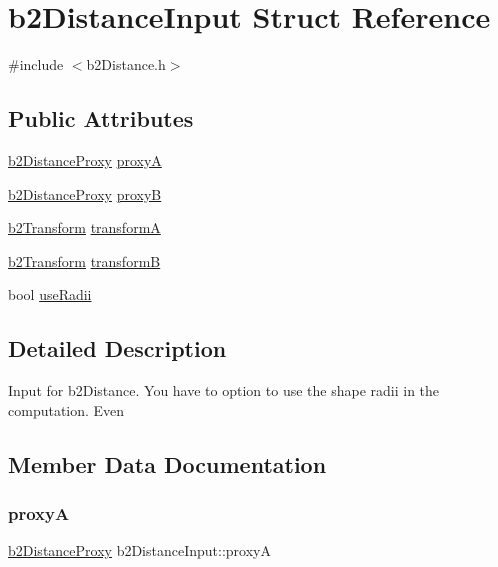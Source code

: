 \hypertarget{structb2_distance_input}{}\section{b2\+Distance\+Input Struct Reference}
\label{structb2_distance_input}


{\ttfamily \#include $<$b2\+Distance.\+h$>$}

\subsection*{Public Attributes}
\begin{DoxyCompactItemize}
\item 
\mbox{\hyperlink{structb2_distance_proxy}{b2\+Distance\+Proxy}} \mbox{\hyperlink{structb2_distance_input_a84d378f4f0e2f06fbe03d413e9dfbbd9}{proxyA}}
\item 
\mbox{\hyperlink{structb2_distance_proxy}{b2\+Distance\+Proxy}} \mbox{\hyperlink{structb2_distance_input_ad08521a9cdf9d418ececfd44de83a5d3}{proxyB}}
\item 
\mbox{\hyperlink{structb2_transform}{b2\+Transform}} \mbox{\hyperlink{structb2_distance_input_a0889c2f7120ba521d6e40e2a22834ddb}{transformA}}
\item 
\mbox{\hyperlink{structb2_transform}{b2\+Transform}} \mbox{\hyperlink{structb2_distance_input_a47352d7c5b3db80b2fb8cf338f1c1895}{transformB}}
\item 
bool \mbox{\hyperlink{structb2_distance_input_ab72a770be4a91997d00112409de5fea7}{use\+Radii}}
\end{DoxyCompactItemize}


\subsection{Detailed Description}
Input for b2\+Distance. You have to option to use the shape radii in the computation. Even 

\subsection{Member Data Documentation}
\mbox{\label{structb2_distance_input_a84d378f4f0e2f06fbe03d413e9dfbbd9}} 
\subsubsection{\texorpdfstring{proxyA}{proxyA}}
{\footnotesize\ttfamily \mbox{\hyperlink{structb2_distance_proxy}{b2\+Distance\+Proxy}} b2\+Distance\+Input\+::proxyA}

